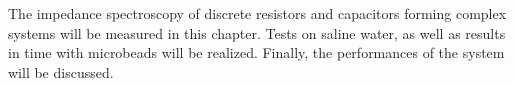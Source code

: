 The impedance spectroscopy of discrete resistors and capacitors forming complex systems will be measured in this chapter. Tests on saline water, as well as results in time with microbeads will be realized. Finally, the performances of the system will be discussed. 